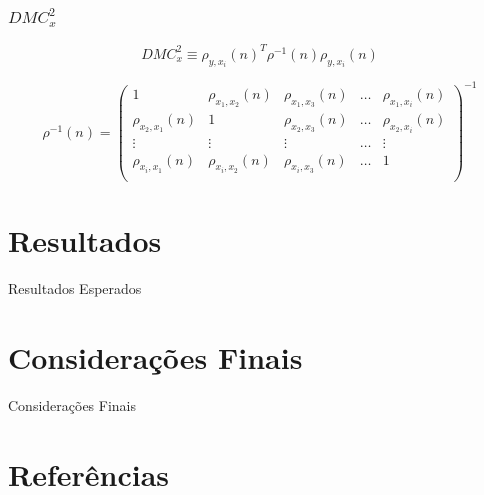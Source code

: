 \documentclass[10pt]{beamer}
\newcommand{\dmc}{\(DMC_x^2\) }
\begin{document}
\begin{frame}
  \frametitle{\dmc}
  \begin{equation}\label{eq:dmc}
  {DMC}_{x}^{2}  \equiv \rho_{y,x_{i}}(n)^{T} \rho^{-1}(n) \rho_{y,x_{i}}(n)
\end{equation}


\begin{equation}\label{eq:dmc_mat_inv}
  \rho^{-1}(n) = \left(\begin{matrix} 
    1 & \rho_{x_{1},x_{2}}(n)                       &  \rho_{x_{1},x_{3}}(n) & \dots  &  \rho_{x_{1},x_{i}}(n) \\
    \rho_{x_{2},x_{1}}(n) & 1                       &  \rho_{x_{2},x_{3}}(n) & \dots  &  \rho_{x_{2},x_{i}}(n) \\
    \vdots                &  \vdots                 &  \vdots                & \dots  & \vdots \\
    \rho_{x_{i},x_{1}}(n) & \rho_{x_{i},x_{2}}(n)   &  \rho_{x_{i},x_{3}}(n) & \dots  &  1 \\
    \end{matrix}\right)^{-1}
\end{equation}

  

\end{frame}


\section{Resultados}

\begin{frame}{Resultados Esperados}


  
\end{frame}

\section{Considerações Finais}

\begin{frame}{Considerações Finais}



\end{frame}


\section{Referências}

\begin{frame}[allowframebreaks]

  
  
\end{frame}
\end{document}
